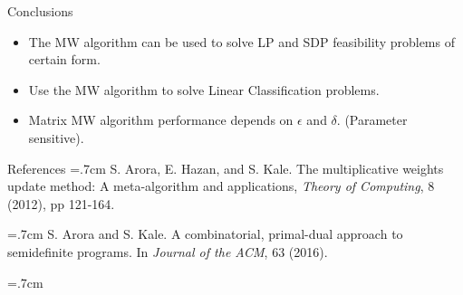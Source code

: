\documentclass{beamer}
\begin{document}
\begin{frame}{Conclusions}
\begin{itemize}
\item The MW algorithm can be used to solve LP and SDP feasibility problems of certain form.
\item 
Use the MW algorithm to solve Linear Classification problems.
\item
Matrix MW algorithm performance depends on $\epsilon$ and $\delta$. (Parameter sensitive).
\end{itemize}
\end{frame}

\begin{frame}{References}
\noindent
\hangindent=.7cm 
S. Arora, E. Hazan, and S. Kale. The multiplicative weights update method: A meta-algorithm and applications, \emph{Theory of Computing}, 8 (2012), pp 121-164.

\vspace{.5cm}
\noindent
\hangindent=.7cm 
S. Arora and S. Kale. A combinatorial, primal-dual approach to semidefinite programs. In \emph{Journal of the ACM}, 63 (2016).

\vspace{.5cm}
\noindent
\hangindent=.7cm 

\end{frame}
\end{document}

